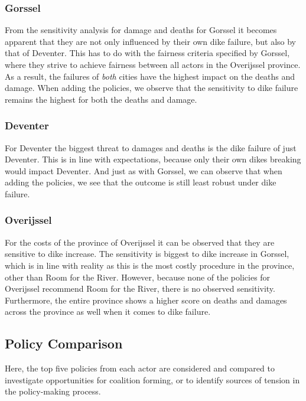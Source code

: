 \subsubsection{Gorssel}

From the sensitivity analysis for damage and deaths for Gorssel it becomes apparent that they are not only influenced by their own dike failure, but also by that of Deventer. This has to do with the fairness criteria specified by Gorssel, where they strive to achieve fairness between all actors in the Overijssel province. As a result, the failures of \textit{both} cities have the highest impact on the deaths and damage. When adding the policies, we observe that the sensitivity to dike failure remains the highest for both the deaths and damage. 

\subsubsection{Deventer}

For Deventer the biggest threat to damages and deaths is the dike failure of just Deventer. This is in line with expectations, because only their own dikes breaking would impact Deventer. And just as with Gorssel, we can observe that when adding the policies, we see that the outcome is still least robust under dike failure. 

\subsubsection{Overijssel}

For the costs of the province of Overijssel it can be observed that they are sensitive to dike increase. The sensitivity is biggest to dike increase in Gorssel, which is in line with reality as this is the most costly procedure in the province, other than Room for the River. However, because none of the policies for Overijssel recommend Room for the River, there is no observed sensitivity. Furthermore, the entire province shows a higher score on deaths and damages across the province as well when it comes to dike failure. 

\subsection{Policy Comparison}
Here, the top five policies from each actor are considered and compared to investigate opportunities for coalition forming, or to identify sources of tension in the policy-making process.